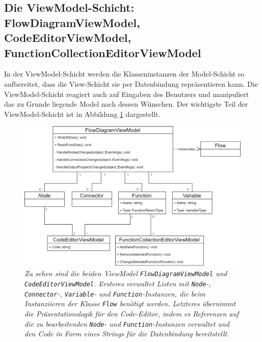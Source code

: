 \subsection[Die ViewModel-Schicht]{Die ViewModel-Schicht: FlowDiagramViewModel, CodeEditorViewModel, FunctionCollectionEditorViewModel}
\label{subsec:Die Viewmodel-Schicht}
In der ViewModel-Schicht werden die Klasseninstanzen der Model-Schicht so aufbereitet, dass die View-Schicht sie per Datenbindung repräsentieren kann. Die ViewModel-Schicht reagiert auch auf Eingaben des Benutzers und manipuliert das zu Grunde liegende Model nach dessen Wünschen. Der wichtigste Teil der ViewModel-Schicht ist in Abbildung \ref{fig:UML:FlowViewModel} dargestellt.
\begin{figure} %
	\centering
		\includegraphics[width=\textwidth]{img/FlowDiagramViewModelUML.png}
	\caption[Klassenstruktur der ViewModel-Schicht]{\textit{Zu sehen sind die beiden ViewModel \texttt{FlowDiagramViewModel} und \texttt{CodeEditorViewModel}. Ersteres verwaltet Listen mit \texttt{Node}-, \texttt{Con\-nec\-tor}-, \texttt{Variable}- und \texttt{Function}-Instanzen, die beim Instanziieren der Klasse \texttt{Flow} benötigt werden. Letzteres übernimmt die Präsentationslogik für den Code-Editor, indem es Referenzen auf die zu bearbeitenden \texttt{Node}- und \texttt{Function}-Instanzen verwaltet und den Code in Form eines Strings für die Datenbindung bereitstellt.}}
	\label{fig:UML:FlowViewModel}
\end{figure}
